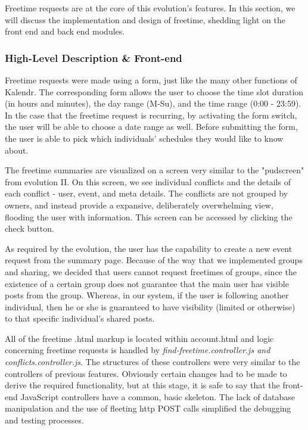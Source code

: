 \documentclass[a4paper]{article}
\begin{document}
Freetime requests are at the core of this evolution's features. In this section, we will discuss the implementation and design of freetime, shedding light on the front end and back end modules.

\subsubsection{High-Level Description \& Front-end}

Freetime requests were made using a form, just like the many other functions of Kalendr. The corresponding form allows the user to choose the time slot duration (in hours and minutes), the day range (M-Su), and the time range (0:00 - 23:59). In the case that the freetime request is recurring, by activating the form switch, the user will be able to choose a date range as well. Before submitting the form, the user is able to pick which individuals' schedules they would like to know about.

The freetime summaries are visualized on a screen very similar to the "pudscreen" from evolution II. On this screen, we see individual conflicts and the details of each conflict - user, event, and meta details. The conflicts are not grouped by owners, and instead provide a expansive, deliberately overwhelming view, flooding the user with information. This screen can be accessed by clicking the check button.

As required by the evolution, the user has the capability to create a new event request from the summary page. Because of the way that we implemented groups and sharing, we decided that users cannot request freetimes of groups, since the existence of a certain group does not guarantee that the main user has visible posts from the group. Whereas, in our system, if the user is following another individual, then he or she is guaranteed to have visibility (limited or otherwise) to that specific individual's shared posts.

All of the freetime .html markup is located within account.html and logic concerning freetime requests is handled by \emph{find-freetime.controller.js and conflicts.controller.js}. The structures of these controllers were very similar to the controllers of previous features. Obviously certain changes had to be made to derive the required functionality, but at this stage, it is safe to say that the front-end JavaScript controllers have a common, basic skeleton. The lack of database manipulation and the use of fleeting http POST calls simplified the debugging and testing processes.
\end{document}
